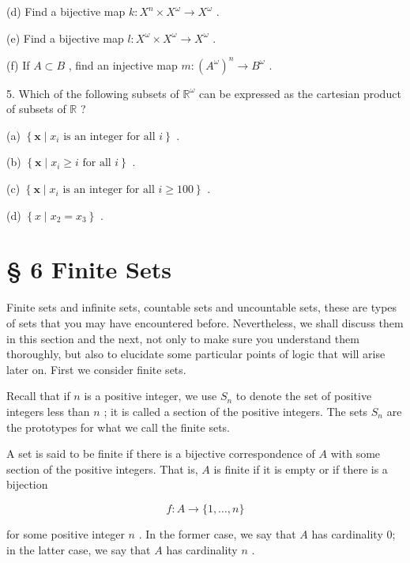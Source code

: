 (d) Find a bijective map \(k : {X}^{n} \times  {X}^{\omega } \rightarrow  {X}^{\omega }\) .

(e) Find a bijective map \(l : {X}^{\omega } \times  {X}^{\omega } \rightarrow  {X}^{\omega }\) .

(f) If \(A \subset  B\) , find an injective map \(m : {\left( {A}^{\omega }\right) }^{n} \rightarrow  {B}^{\omega }\) .

5. Which of the following subsets of \({\mathbb{R}}^{\omega }\) can be expressed as the cartesian product of subsets of \(\mathbb{R}\) ?

(a) \(\left\{  {\mathbf{x} \mid  {x}_{i}\text{ is an integer for all }i}\right\}\) .

(b) \(\left\{  {\mathbf{x} \mid  {x}_{i} \geq  i\text{ for all }i}\right\}\) .

(c) \(\left\{  {\mathbf{x} \mid  {x}_{i}\text{ is an integer for all }i \geq  {100}}\right\}\) .

(d) \(\left\{  {x \mid  {x}_{2} = {x}_{3}}\right\}\) .

\section*{§ 6 Finite Sets}

Finite sets and infinite sets, countable sets and uncountable sets, these are types of sets that you may have encountered before. Nevertheless, we shall discuss them in this section and the next, not only to make sure you understand them thoroughly, but also to elucidate some particular points of logic that will arise later on. First we consider finite sets.

Recall that if \(n\) is a positive integer, we use \({S}_{n}\) to denote the set of positive integers less than \(n\) ; it is called a section of the positive integers. The sets \({S}_{n}\) are the prototypes for what we call the finite sets.

\begin{definition} A set is said to be finite if there is a bijective correspondence of \(A\) with some section of the positive integers. That is, \(A\) is finite if it is empty or if there is a bijection

\[
f : A \rightarrow  \{ 1,\ldots ,n\}
\]

for some positive integer \(n\) . In the former case, we say that \(A\) has cardinality 0; in the latter case, we say that \(A\) has cardinality \(n\) .
\end{definition}

